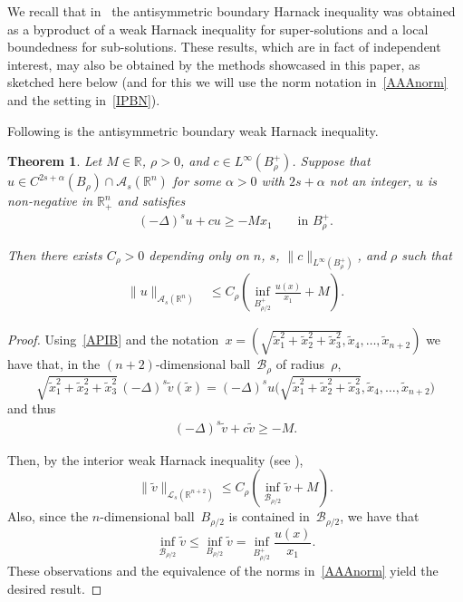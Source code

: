 \documentclass[a4paper,12pt,reqno]{amsart}
\numberwithin{equation}{section}
\newtheorem{theorem}{Theorem}[section]
\theoremstyle{definition}
\theoremstyle{notation}
\newcommand{\R}{\mathds{R}}
\renewcommand{\le}{\leqslant}
\begin{document}
We recall that in~\cite{dtv}
the antisymmetric boundary
Harnack inequality was obtained as a byproduct of a weak Harnack inequality for super-solutions and a local boundedness for sub-solutions. These results, which are in fact of independent interest,
may also be obtained by the methods showcased in this paper, as sketched here below
(and for this we will use the norm notation in~\eqref{AAAnorm}
and the setting in~\eqref{IPBN}).


Following is the antisymmetric boundary weak Harnack inequality. 


\begin{theorem} 
Let \(M\in \R\), \(\rho>0\), and \(c\in L^\infty(B_\rho^+)\). Suppose that \(u\in C^{2s+\alpha}(B_\rho)\cap \mathscr{A}_s(\R^n)\) for some \(\alpha > 0\) with \(2s+\alpha\) not an integer, \(u\) is non-negative in \(\R^n_+\) and satisfies \begin{align*}
(-\Delta)^s u +cu \geqslant -Mx_1 \qquad \text{in } B_\rho^+.
\end{align*}


Then there exists \(C_\rho>0\) depending only on \(n\), \(s\), \(\| c \|_{L^\infty(B_\rho^+)}\), and \(\rho\) such that \begin{align*}
 \| u\|_{  \mathscr A_s(\R^n) }  &\leqslant  C_\rho \left(  \inf_{B_{\rho/2}^+} \frac{u(x)}{x_1} +M \right).
\end{align*}  
\end{theorem} 


\begin{proof} Using~\eqref{APIB} and the notation~$x = (\sqrt{\tilde x_1^2 + \tilde x_2^2 + \tilde x_3^2}, \tilde x_4, \ldots, \tilde x_{n+2})$ we have that, in the $(n+2)$-dimensional ball~${\mathcal{B}}_\rho$ of radius~$\rho$,
\begin{equation}\label{apdoghAi-2083c4} \sqrt{\tilde x_1^2 + \tilde x_2^2 + \tilde x_3^2  } \, (-\Delta)^s\tilde v (\tilde x) = (-\Delta)^su \Big (\sqrt{\tilde x_1^2 + \tilde x_2^2 + \tilde x_3^2}, \tilde x_4, \ldots, \tilde x_{n+2} \Big ) 
\end{equation}
and thus
\begin{align*}
(-\Delta)^s \tilde v +c\tilde v \geqslant -M .
\end{align*}


Then, by the interior  weak Harnack inequality (see \cite[Theorem 2.2]{MR4023466}),
$$\|\tilde v\|_{  \mathscr L_s(\R^{n+2}) } \leqslant C_\rho \left( \inf_{{\mathcal{B}}_{\rho/2}} \tilde v + M \right) .$$
Also, since the $n$-dimensional ball~$B_{\rho/2}$ is contained in~${\mathcal{B}}_{\rho/2}$, we have that
$$  \inf_{{\mathcal{B}}_{\rho/2}} \tilde v\le\inf_{B_{\rho/2}} \tilde v=\inf_{B_{\rho/2}^+} \frac{u(x)}{x_1} .
$$
These observations and the equivalence of the norms in~\eqref{AAAnorm} yield the desired result.
\end{proof}
\end{document}
